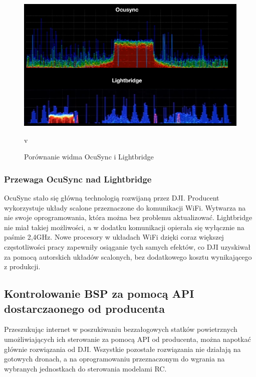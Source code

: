\begin{figure}[!htbp]
\begin{center}
\includegraphics[width=14cm]{./Obrazy/ocusync_vs_lightbridge.png}
\caption{Porównanie widma OcuSync i Lightbridge}
v
\end{center}
\end{figure}

\newpage

\subsubsection{Przewaga OcuSync nad Lightbridge}
OcuSync stało się główną technologią rozwijaną przez DJI. Producent wykorzystuje układy scalone przeznaczone do komunikacji WiFi. Wytwarza na nie swoje oprogramowania, która można bez problemu aktualizować. Lightbridge nie miał takiej możliwości, a w dodatku komunikacji opierała się wyłącznie na paśmie 2,4GHz. Nowe procesory w układach WiFi dzięki coraz większej częstotliwości pracy zapewniły osiąganie tych samych efektów, co DJI uzyskiwał za pomocą autorskich układów scalonych, bez dodatkowego kosztu wynikającego z produkcji.

\subsection{Kontrolowanie BSP za pomocą API dostarczaonego od producenta}
Przeszukując internet w poszukiwaniu bezzałogowych statków powietrznych umożliwiających ich sterowanie za pomocą API od producenta, można napotkać głównie rozwiązania od DJI. Wszystkie pozostałe rozwiązania nie działają na gotowych dronach, a na oprogramowaniu przeznaczonym do wgrania na wybranych jednostkach do sterowania modelami RC.

